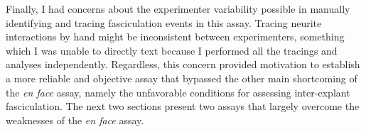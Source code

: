 Finally, I had concerns about the experimenter variability possible in manually identifying and tracing fasciculation events in this assay.
Tracing neurite interactions by hand might be inconsistent between experimenters, something which I was unable to directly text because I performed all the tracings and analyses independently.
Regardless, this concern provided motivation to establish a more reliable and objective assay that bypassed the other main shortcoming of the \emph{en face} assay, namely the unfavorable conditions for assessing inter-explant fasciculation.
The next two sections present two assays that largely overcome the weaknesses of the \emph{en face} assay.
